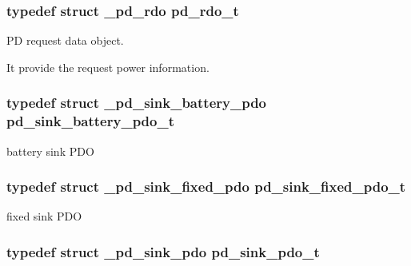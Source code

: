 \hypertarget{group__usb__pd__stack_ga4dcb1103574222cf94d4b45128f2b884}{
\subsubsection[{pd\-\_\-rdo\-\_\-t}]{\setlength{\rightskip}{0pt plus 5cm}typedef struct {\bf \-\_\-pd\-\_\-rdo}  {\bf pd\-\_\-rdo\-\_\-t}}}\label{group__usb__pd__stack_ga4dcb1103574222cf94d4b45128f2b884}


P\-D request data object. 

It provide the request power information. \hypertarget{group__usb__pd__stack_ga917a58335ea75ba8b8cc3c359e1dee7a}{
\subsubsection[{pd\-\_\-sink\-\_\-battery\-\_\-pdo\-\_\-t}]{\setlength{\rightskip}{0pt plus 5cm}typedef struct {\bf \-\_\-pd\-\_\-sink\-\_\-battery\-\_\-pdo}  {\bf pd\-\_\-sink\-\_\-battery\-\_\-pdo\-\_\-t}}}\label{group__usb__pd__stack_ga917a58335ea75ba8b8cc3c359e1dee7a}


battery sink P\-D\-O 

\hypertarget{group__usb__pd__stack_gac1092e8fe40315ed926966b5b17883aa}{
\subsubsection[{pd\-\_\-sink\-\_\-fixed\-\_\-pdo\-\_\-t}]{\setlength{\rightskip}{0pt plus 5cm}typedef struct {\bf \-\_\-pd\-\_\-sink\-\_\-fixed\-\_\-pdo}  {\bf pd\-\_\-sink\-\_\-fixed\-\_\-pdo\-\_\-t}}}\label{group__usb__pd__stack_gac1092e8fe40315ed926966b5b17883aa}


fixed sink P\-D\-O 

\hypertarget{group__usb__pd__stack_gaf835814fe2dcf1f17e9e0c58bc74b6ba}{
\subsubsection[{pd\-\_\-sink\-\_\-pdo\-\_\-t}]{\setlength{\rightskip}{0pt plus 5cm}typedef struct {\bf \-\_\-pd\-\_\-sink\-\_\-pdo}  {\bf pd\-\_\-sink\-\_\-pdo\-\_\-t}}}\label{group__usb__pd__stack_gaf835814fe2dcf1f17e9e0c58bc74b6ba}


